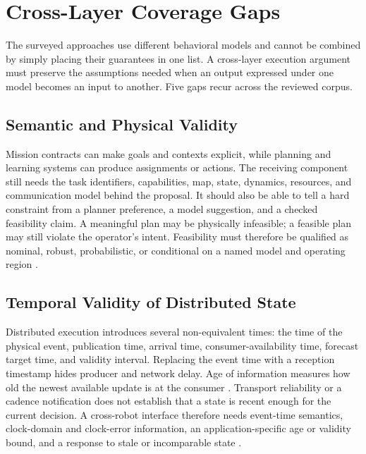 \section{Cross-Layer Coverage Gaps}
\label{sec:gaps}

The surveyed approaches use different behavioral models and cannot be combined
by simply placing their guarantees in one list.  A cross-layer execution
argument must preserve the assumptions needed when an output expressed under
one model becomes an input to another.  Five gaps recur across the reviewed
corpus.

\subsection{Semantic and Physical Validity}

Mission contracts can make goals and contexts explicit, while planning and
learning systems can produce assignments or actions.  The receiving component
still needs the task identifiers, capabilities, map, state, dynamics, resources,
and communication model behind the proposal.  It should also be able to tell a
hard constraint from a planner preference, a model suggestion, and a checked
feasibility claim.  A meaningful plan may be physically infeasible; a feasible
plan may still violate the operator's intent.  Feasibility must therefore be
qualified as nominal, robust, probabilistic, or conditional on a named model and
operating region
\cite{mallozzi2020crome,mallozzi2022repair,mandi2023roco,obata2024lipllm,
chaki2013probabilistic}.

\subsection{Temporal Validity of Distributed State}

Distributed execution introduces several non-equivalent times: the time of the
physical event, publication time, arrival time, consumer-availability time,
forecast target time, and validity interval.  Replacing the event time with a
reception timestamp hides producer and network delay.  Age of information
measures how old the newest available update is at the consumer
\cite{kaul2012aoi}.  Transport reliability or a cadence notification does not
establish that a state is recent enough for the current decision.  A cross-robot interface therefore needs
event-time semantics, clock-domain and clock-error information, an
application-specific age or validity bound, and a response to stale or
incomparable state \cite{omg2015dds,kronauer2021latency}.

